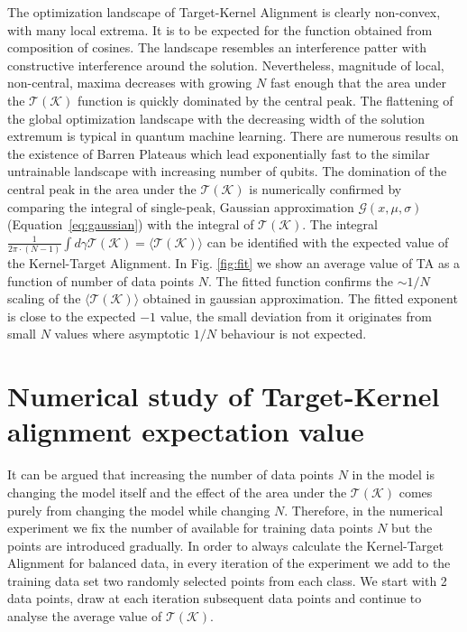 \documentclass{article}
\begin{document}
The optimization landscape of Target-Kernel Alignment is clearly non-convex, with many local extrema. It is to be expected for the function obtained from composition of cosines. The landscape resembles an interference patter with constructive interference around the solution. Nevertheless, magnitude of local, non-central, maxima decreases with growing $N$ fast enough that the area under the $\mathcal{T}(\mathcal{K})$ function is quickly dominated by the central peak. The flattening of the global optimization landscape with the decreasing width of the solution extremum is typical in quantum machine learning. There are numerous results on the existence of Barren Plateaus {\cite{mcclean2018barren}} which lead exponentially fast to the similar untrainable landscape with increasing number of qubits. The domination of the central peak in the area under the $\mathcal{T}(\mathcal{K})$ is numerically confirmed by comparing the integral of single-peak, Gaussian approximation $\mathcal{G}(x,\mu,\sigma)$ (Equation~\ref{eq:gaussian}) with the integral of $\mathcal{T}(\mathcal{K})$. The integral $\frac{1}{2\pi\cdot(N-1)}\int d\gamma \mathcal{T}(\mathcal{K}) = \langle \mathcal{T}(\mathcal{K}) \rangle$ can be identified with the expected value of the Kernel-Target Alignment.
In Fig. \ref{fig:fit} we show an average value of TA as a function of number of data points $N$. The fitted function confirms the $\sim 1/N$ scaling of the $\langle \mathcal{T}(\mathcal{K})\rangle$ obtained in gaussian approximation. The fitted exponent is close to the expected $-1$ value, the small deviation from it originates from small $N$ values where asymptotic $1/N$ behaviour is not expected.

\section{Numerical study of Target-Kernel alignment expectation value}
It can be argued that increasing the number of data points $N$ in the model is changing the model itself and the effect of the area under the $\mathcal{T}(\mathcal{K})$ comes purely from changing the model while changing $N$.
Therefore, in the numerical experiment we fix the number of available for training data points $N$ but the points are introduced gradually.
In order to always calculate the Kernel-Target Alignment for balanced data, in every iteration of the experiment we add to the training data set two randomly selected points from each class. We start with 2 data points, draw at each iteration subsequent data points and continue to analyse the average value of $\mathcal{T}(\mathcal{K})$. 
\end{document}
